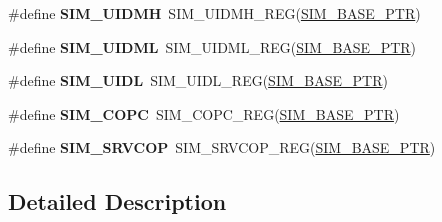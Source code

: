 \begin{DoxyCompactItemize}
\#define {\bfseries S\+I\+M\+\_\+\+U\+I\+D\+MH}~S\+I\+M\+\_\+\+U\+I\+D\+M\+H\+\_\+\+R\+EG(\hyperlink{group___s_i_m___peripheral_ga719ec5df95fbb5732438f794f2cccf3c}{S\+I\+M\+\_\+\+B\+A\+S\+E\+\_\+\+P\+TR})
\item 
\mbox{\label{group___s_i_m___register___accessor___macros_gafcfbcc294236ebd497bbc60dc8b7989b}} 
\#define {\bfseries S\+I\+M\+\_\+\+U\+I\+D\+ML}~S\+I\+M\+\_\+\+U\+I\+D\+M\+L\+\_\+\+R\+EG(\hyperlink{group___s_i_m___peripheral_ga719ec5df95fbb5732438f794f2cccf3c}{S\+I\+M\+\_\+\+B\+A\+S\+E\+\_\+\+P\+TR})
\item 
\mbox{\label{group___s_i_m___register___accessor___macros_ga70ca9df0243083e9ba6b7b037beaa69d}} 
\#define {\bfseries S\+I\+M\+\_\+\+U\+I\+DL}~S\+I\+M\+\_\+\+U\+I\+D\+L\+\_\+\+R\+EG(\hyperlink{group___s_i_m___peripheral_ga719ec5df95fbb5732438f794f2cccf3c}{S\+I\+M\+\_\+\+B\+A\+S\+E\+\_\+\+P\+TR})
\item 
\mbox{\label{group___s_i_m___register___accessor___macros_gaa93ea724cc50ba69565f9d38d46e2cea}} 
\#define {\bfseries S\+I\+M\+\_\+\+C\+O\+PC}~S\+I\+M\+\_\+\+C\+O\+P\+C\+\_\+\+R\+EG(\hyperlink{group___s_i_m___peripheral_ga719ec5df95fbb5732438f794f2cccf3c}{S\+I\+M\+\_\+\+B\+A\+S\+E\+\_\+\+P\+TR})
\item 
\mbox{\label{group___s_i_m___register___accessor___macros_ga31a4e51e0655268b6aa618acf0bd1ef4}} 
\#define {\bfseries S\+I\+M\+\_\+\+S\+R\+V\+C\+OP}~S\+I\+M\+\_\+\+S\+R\+V\+C\+O\+P\+\_\+\+R\+EG(\hyperlink{group___s_i_m___peripheral_ga719ec5df95fbb5732438f794f2cccf3c}{S\+I\+M\+\_\+\+B\+A\+S\+E\+\_\+\+P\+TR})
\end{DoxyCompactItemize}


\subsection{Detailed Description}
